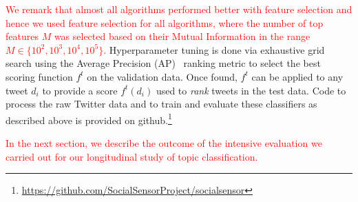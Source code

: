 \textcolor{red}{We remark that almost all algorithms 
performed better with feature selection and hence we used feature
selection for all algorithms, where the number of top features $M$ was selected based on their Mutual Information in the range $M \in \{10^2, 10^3, 10^4, 10^5\}$. }
Hyperparameter tuning is done via exhaustive grid search
using the Average Precision
(AP)~\cite{manning_ir} ranking metric to select the best scoring function $f^t$ on the validation data.
Once found, $f^t$ can be applied to any tweet $d_i$ to provide a score $f^t(d_i)$
used to \emph{rank} tweets in the test data.
Code to process the raw Twitter data and to train and evaluate these classifiers as described above is provided on github.\footnote{\url{https://github.com/SocialSensorProject/socialsensor}}

\textcolor{red}{In the next section, we describe the outcome of the intensive evaluation we carried out for our longitudinal study of topic classification.}